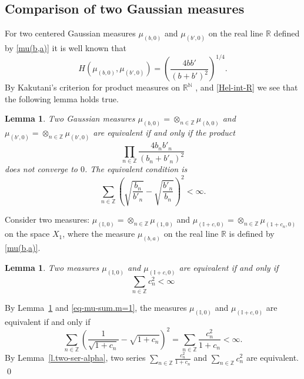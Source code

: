 \documentclass[preprint,12pt]{elsarticle}
\newtheorem{lem}[thm]{Lemma}
\numberwithin{equation}{section}
\begin{document}
\subsection{Comparison of two Gaussian measures}
\label{sec.Gauss-meas}
%
For two centered Gaussian measures $\mu_{(b,0)}$ and $\mu_{(b',0)}$ on the real line $\mathbb R$ defined by \eqref{mu(b,a)}  it is well known that  
\begin{equation}
\label{Hel-int-R}
H(\mu_{(b,0)},\mu_{(b',0)})=\left(\frac{4bb'}{(b+b')^2}\right)^{1/4}.
\end{equation}
By Kakutani's criterion for product measures on $\mathbb R^{\mathbb N}$ {\rm \cite {Kak48}}, and \eqref{Hel-int-R} we see that the following lemma holds true.
%
\begin{lem}
\label{l.eq-prod.m=1}
 Two Gaussian  measures $\mu_{(b,0)}=\otimes_{n\in \mathbb Z}\mu_{(b,0)}$ and $\mu_{(b',0)}=\otimes_{n\in \mathbb Z}\mu_{(b',0)}$ are equivalent if and only if the product
\begin{equation}
\label{eq-mu-prod.m=1} 
\prod_{n\in \mathbb Z}\frac{4b_{n}b'_{n}}{(b_{n}+b'_{n})^2}
\end{equation}
does not converge to $0$. The equivalent condition is 
\begin{equation}
 \label{eq-mu-sum.m=1} 
\sum_{n\in \mathbb Z}
\left(\sqrt{\frac{b_{n}}{b'_{n}}}- \sqrt{\frac{b'_{n}}{b_{n}}}\right)^2<\infty.
\end{equation}
\end{lem}
%
 Consider  
two measures: $\mu_{({\mathbb I},0)}=\otimes_{n\in \mathbb Z}\mu_{(1,0)}$ 
and  $\mu_{({\mathbb I}+c,0)}=\otimes_{n\in \mathbb Z}\mu_{(1+c_n,0)}$ on the space $X_1$,  where the measure $\mu_{(b,a)}$ on the real line $\mathbb R$ is defined by \eqref{mu(b,a)}.
%
\begin{lem}
\label{l.eq-prod} 
Two measures  $\mu_{({\mathbb I},0)}$ and  $\mu_{({\mathbb  I}+c,0)}$ are equivalent if and only if 
\begin{equation}
\label{eq-prod} 
\sum_{n\in \mathbb Z}c_n^2<\infty
\end{equation}
\end{lem}
%
\begin{pf}
By Lemma~\ref{l.eq-prod.m=1} and 
\eqref{eq-mu-sum.m=1},  the measures $\mu_{({\mathbb I},0)}$ and $\mu_{({\mathbb I}+c,0)}$
are equivalent if and only if 
\begin{equation*}
\sum_{n\in \mathbb Z}
\left(\frac{1}{\sqrt{1+c_n}}-\sqrt{1+c_n}\right)^2=\sum_{n\in \mathbb Z}
\frac{c_n^2}{1+c_n}
<\infty.
\end{equation*}
By Lemma~\ref{l.two-ser-alpha},
 two series $\sum_{n\in \mathbb Z}
\frac{c_n^2}{1+c_n}$ and $\sum_{n\in \mathbb Z}c_n^2$ are equivalent. 
\qed\end{pf}
\end{document}
